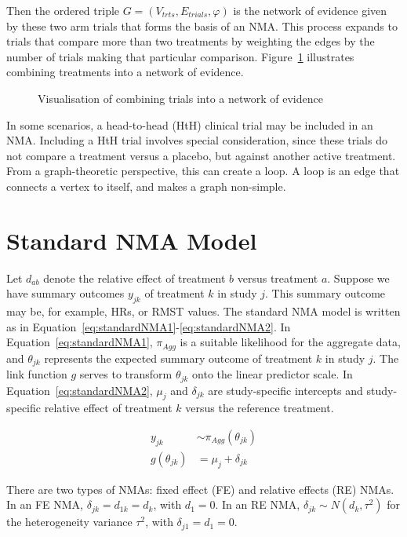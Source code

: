 Then the ordered triple $G = (V_{trts}, E_{trials}, \varphi)$ is the network of evidence given by these two arm trials that forms the basis of an NMA. This process expands to trials that compare more than two treatments by weighting the edges by the number of trials making that particular comparison. Figure~\ref{fig:comb_evi} illustrates combining treatments into a network of evidence.\\

\begin{figure}[h]
    \centering
    
    \caption{Visualisation of combining trials into a network of evidence}
    \label{fig:comb_evi}
\end{figure}

In some scenarios, a head-to-head (HtH) clinical trial may be included in an NMA. Including a HtH trial involves special consideration, since these trials do not compare a treatment versus a placebo, but against another active treatment. From a graph-theoretic perspective, this can create a loop. A loop is an edge that connects a vertex to itself, and makes a graph non-simple.

\section{Standard NMA Model}
Let $d_{ab}$ denote the relative effect of treatment $b$ versus treatment $a$. Suppose we have summary outcomes $y_{jk}$ of treatment $k$ in study $j$. This summary outcome may be, for example, HRs, or RMST values. The standard NMA model is written as in Equation~\ref{eq:standardNMA1}-\ref{eq:standardNMA2}. In Equation~\ref{eq:standardNMA1}, $\pi_{Agg}$ is a suitable likelihood for the aggregate data, and $\theta_{jk}$ represents the expected summary outcome of treatment $k$ in study $j$. The link function $g$ serves to transform $\theta_{jk}$ onto the linear predictor scale. In Equation~\ref{eq:standardNMA2}, $\mu_j$ and $\delta_{jk}$ are study-specific intercepts and study-specific relative effect of treatment $k$ versus the reference treatment.

\begin{align}
    y_{jk} &\sim \pi_{Agg}(\theta_{jk}) \label{eq:standardNMA1} \\
    g(\theta_{jk}) &= \mu_j + \delta_{jk} \label{eq:standardNMA2}
\end{align}

There are two types of NMAs: fixed effect (FE) and relative effects (RE) NMAs. In an FE NMA, $\delta_{jk} = d_{1k} = d_k$, with $d_1 = 0$. In an RE NMA, $\delta_{jk} \sim N(d_k, \tau^2)$ for the heterogeneity variance $\tau^2$, with $\delta_{j1} = d_1 = 0$. \\


